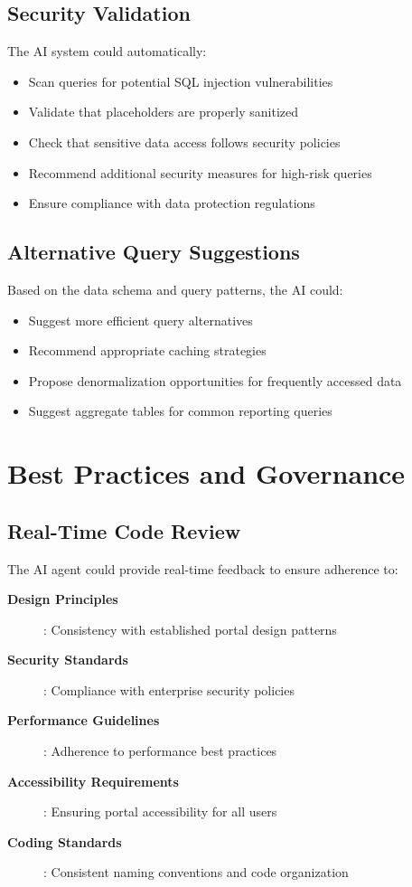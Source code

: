 \subsection{Security Validation}

The AI system could automatically:
\begin{itemize}
\item Scan queries for potential SQL injection vulnerabilities
\item Validate that \wbpl{} placeholders are properly sanitized
\item Check that sensitive data access follows security policies
\item Recommend additional security measures for high-risk queries
\item Ensure compliance with data protection regulations
\end{itemize}

\subsection{Alternative Query Suggestions}

Based on the data schema and query patterns, the AI could:
\begin{itemize}
\item Suggest more efficient query alternatives
\item Recommend appropriate caching strategies
\item Propose denormalization opportunities for frequently accessed data
\item Suggest aggregate tables for common reporting queries
\end{itemize}

\section{Best Practices and Governance}
\label{sec:best-practices}

\subsection{Real-Time Code Review}

The AI agent could provide real-time feedback to ensure adherence to:

\begin{description}
\item[\textbf{Design Principles}]: Consistency with established portal design patterns
\item[\textbf{Security Standards}]: Compliance with enterprise security policies
\item[\textbf{Performance Guidelines}]: Adherence to performance best practices
\item[\textbf{Accessibility Requirements}]: Ensuring portal accessibility for all users
\item[\textbf{Coding Standards}]: Consistent naming conventions and code organization
\end{description}

